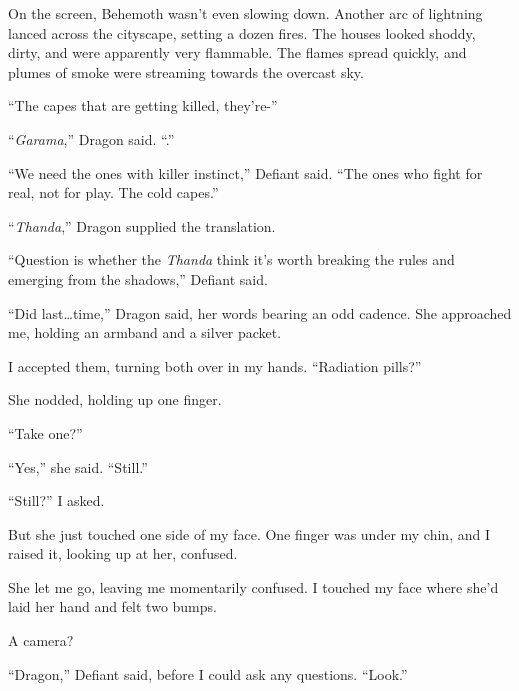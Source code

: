 On the screen, Behemoth wasn't even slowing down.  Another arc of lightning lanced across the cityscape, setting a dozen fires.  The houses looked shoddy, dirty, and were apparently very flammable.  The flames spread quickly, and plumes of smoke were streaming towards the overcast sky.



``The capes that are getting killed, they're-''



``\emph{Garama},'' Dragon said.  ``\ldotsHot.''



``We need the ones with killer instinct,'' Defiant said.  ``The ones who fight for real, not for play.  The cold capes.''



``\emph{Thanda},'' Dragon supplied the translation.



``Question is whether the \emph{Thanda} think it's worth breaking the rules and emerging from the shadows,'' Defiant said.



``Did last\ldots  time,'' Dragon said, her words bearing an odd cadence.  She approached me, holding an armband and a silver packet.



I accepted them, turning both over in my hands.  ``Radiation pills?''



She nodded, holding up one finger.



``Take one?''



``Yes,'' she said.  ``Still.''



``Still?''  I asked.



But she just touched one side of my face.  One finger was under my chin, and I raised it, looking up at her, confused.



She let me go, leaving me momentarily confused.  I touched my face where she'd laid her hand and felt two bumps.



A camera?



``Dragon,'' Defiant said, before I could ask any questions.  ``Look.''



